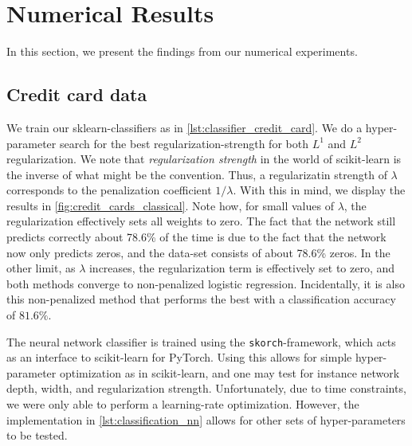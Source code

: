 \documentclass[a4paper, oneside, article]{memoir}
\begin{document}
	\section{Numerical Results}
	
	In this section, we present the findings from our numerical experiments.

	\subsection{Credit card data}
	

	We train our sklearn-classifiers as in
	\cref{lst:classifier_credit_card}. We do a hyper-parameter search for
	the best regularization-strength for both \( L^1 \) and \( L^2 \)
	regularization. We note that \emph{regularization strength} in the
	world of scikit-learn is the inverse of what might be the convention.
	Thus, a regularizatin strength of \( \lambda \) corresponds to the
	penalization coefficient \(  1 / \lambda \). With this in mind, we
	display the results in \cref{fig:credit_cards_classical}. Note how, for
	small values of \( \lambda \), the regularization effectively sets all
	weights to zero. The fact that the network still predicts correctly
	about 78.6\% of the time is due to the fact that the network now only
	predicts zeros, and the data-set consists of about 78.6\% zeros. In the
	other limit, as \( \lambda \) increases, the regularization term is
	effectively set to zero, and both methods converge to non-penalized
	logistic regression. Incidentally, it is also this non-penalized method
	that performs the best with a classification accuracy of \( 81.6 \% \).
	
	The neural network classifier is trained using the
	\texttt{skorch}-framework, which acts as an interface to scikit-learn
	for PyTorch. Using this allows for  simple hyper-parameter optimization
	as in scikit-learn, and one may test for instance network depth, width,
	and regularization strength. Unfortunately, due to time constraints, we
	were only able to perform a learning-rate optimization. However, the
	implementation in \cref{lst:classification_nn} allows for other sets of
	hyper-parameters to be tested. 
\end{document}
